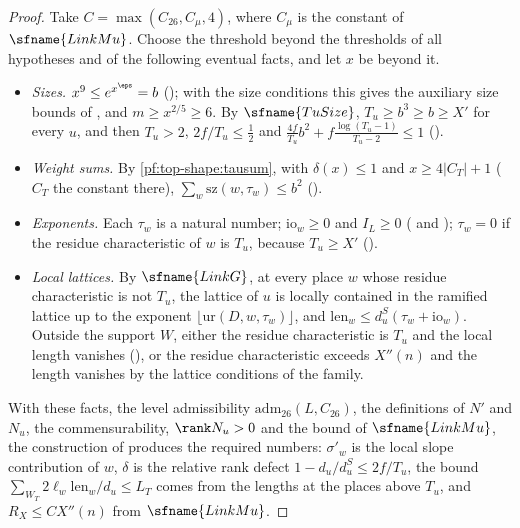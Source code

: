 \begin{proof}
Take $C=\max(C_{26},C_{\mu},4)$, where $C_\mu$ is the constant of $\sfname{LinkMu}$. Choose the threshold beyond the
thresholds of all hypotheses and of the following eventual facts, and let $x$ be beyond it.
\begin{itemize}
\item \emph{Sizes.} $x^9\le e^{x^\eps}=b$ (); with the size conditions
this gives the auxiliary size bounds of , and
$m\ge x^{2/5}\ge6$. By $\sfname{TuSize}$, $T_u\ge b^3\ge b\ge X'$ for every $u$, and then
$T_u>2$, $2f/T_u\le\frac12$ and $\frac{4f}{T_u}b^2+f\frac{\log(T_u-1)}{T_u-2}\le1$
().
\item \emph{Weight sums.} By \cref{pf:top-shape:tausum}, with $\delta(x)\le1$ and $x\ge4|C_T|+1$ ($C_T$ the constant
there), $\sum_{w}\mathrm{sz}(w,\tau_w)\le b^2$ ().
\item \emph{Exponents.} Each $\tau_w$ is a natural number; $\mathrm{io}_w\ge0$ and $I_L\ge0$
( and ); $\tau_w=0$ if
the residue characteristic of $w$ is $T_u$, because $T_u\ge X'$
().
\item \emph{Local lattices.} By $\sfname{LinkG}$, at every place $w$ whose residue characteristic is not $T_u$, the
lattice of $u$ is locally contained in the ramified lattice up to the exponent $\lfloor\mathrm{ur}(D,w,\tau_w)\rfloor$,
and $\mathrm{len}_w\le d^S_u(\tau_w+\mathrm{io}_w)$. Outside the support $W$, either the residue characteristic is $T_u$
and the local length vanishes (), or the residue
characteristic exceeds $X''(n)$ and the length vanishes by the lattice conditions of the family.
\end{itemize}
With these facts, the level admissibility $\mathrm{adm}_{26}(L,C_{26})$, the definitions of $N'$ and $N_u$, the
commensurability, $\rank N_u>0$ and the bound of $\sfname{LinkMu}$, the construction of
 produces the required numbers: $\sigma'_w$ is the local
slope contribution of $w$, $\delta$ is the relative rank defect $1-d_u/d^S_u\le2f/T_u$, the bound
$\sum_{W_T}2\ell_w\mathrm{len}_w/d_u\le L_T$ comes from the lengths at the places above $T_u$, and $R_X\le CX''(n)$
from $\sfname{LinkMu}$.
\end{proof}

